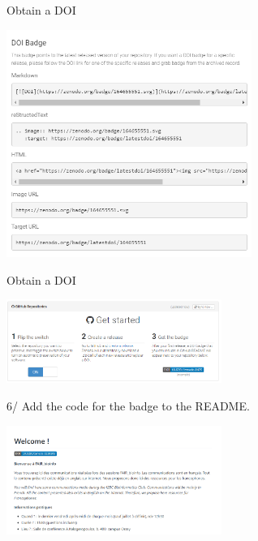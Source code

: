 \begin{frame}{Obtain a DOI}

\begin{center}
    \includegraphics[width=8cm]{08_sharing/images/badge_code.png}
\end{center}

\end{frame}

\begin{frame}{Obtain a DOI}

{\centering\includegraphics[width=7cm]{08_sharing/images/zenodo_github.png}\par }

6/ Add the code for the badge to the README.

{\centering\includegraphics[width=7cm]{08_sharing/images/readme_badge.png}\par }

\end{frame}


